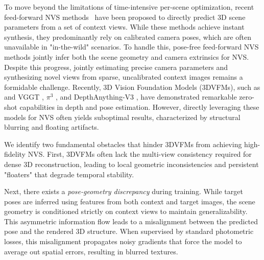 To move beyond the limitations of time-intensive per-scene optimization, recent feed-forward NVS methods~\cite{charatan2024pixelsplat, chen2024mvsplat, xu2025depthsplat, wang2025zpressor} have been proposed to directly predict 3D scene parameters from a set of context views.
While these methods achieve instant synthesis, they predominantly rely on calibrated camera poses, which are often unavailable in "in-the-wild" scenarios. 
To handle this, pose-free feed-forward NVS methods \cite{ye2024no, huang2025no, jiang2025anysplat} jointly infer both the scene geometry and camera extrinsics for NVS.
Despite this progress, jointly estimating precise camera parameters and synthesizing novel views from sparse, uncalibrated context images remains a formidable challenge.
Recently, 3D Vision Foundation Models (3DVFMs), such as and VGGT \cite{wang2025vggt}, $\pi^3$ \cite{wang2025pi3}, and DepthAnything-V3 \cite{lin2025da3}, have demonstrated remarkable zero-shot capabilities in depth and pose estimation. 
However, directly leveraging these models for NVS often yields suboptimal results, characterized by structural blurring and floating artifacts.





We identify two fundamental obstacles that hinder 3DVFMs from achieving high-fidelity NVS. 
First, 3DVFMs often lack the multi-view consistency required for dense 3D reconstruction, leading to local geometric inconsistencies and persistent "floaters" that degrade temporal stability.

Next, there exists a \textit{pose-geometry discrepancy} during training. 
While target poses are inferred using features from both context and target images, the scene geometry is conditioned strictly on context views to maintain generalizability. 
This asymmetric information flow leads to a misalignment between the predicted pose and the rendered 3D structure. 
When supervised by standard photometric losses, this misalignment propagates noisy gradients that force the model to average out spatial errors, resulting in blurred textures. 

